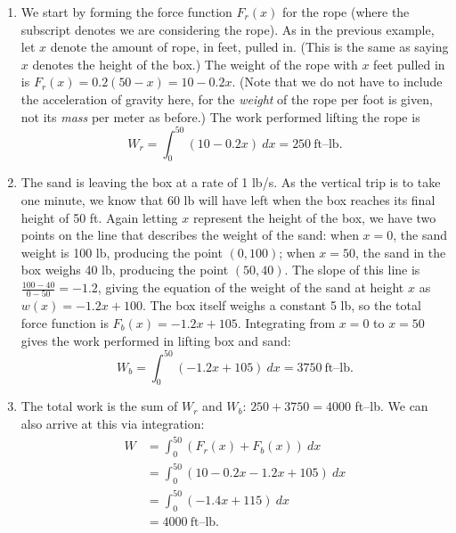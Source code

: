 {\begin{enumerate}
	\item		We start by forming the force function $F_r(x)$ for the rope (where the subscript denotes we are considering the rope). As in the previous example, let $x$ denote the amount of rope, in feet, pulled in. (This is the same as saying $x$ denotes the height of the box.) The weight of the rope with $x$ feet pulled in is $F_r(x) = 0.2(50-x) = 10-0.2x$. (Note that we do not have to include the acceleration of gravity here, for the \textit{weight} of the rope per foot is given, not its \textit{mass} per meter as before.) The work performed lifting the rope is 
\[
W_r = \int_0^{50} (10-0.2x)\ dx = 250\ \text{ft--lb}.
\]
	
	\item	The sand is leaving the box at a rate of 1 lb/s. As the vertical trip is to take one minute, we know that 60 lb will have left when the box reaches its final height of 50 ft. Again letting $x$ represent the height of the box, we have two points on the line that describes the weight of the sand: when $x=0$, the sand weight is 100 lb, producing the point $(0,100)$; when $x=50$, the sand in the box weighs 40 lb, producing the point $(50,40)$. The slope of this line is $\frac{100-40}{0-50} = -1.2$, giving the equation of the weight of the sand at height $x$ as $w(x) = -1.2x+100$. The box itself weighs a constant 5 lb, so the total force function is $F_b(x) = -1.2x+105$. Integrating from $x=0$ to $x=50$ gives the work performed in lifting box and sand:
\[
W_b = \int_0^{50} (-1.2x+105)\ dx = 3750\ \text{ft--lb.}
\]
	
	\item	The total work is the sum of $W_r$ and $W_b$: $250+3750=4000$ ft--lb. We can also arrive at this via integration:
	\begin{align*} W &= \int_0^{50} (F_r(x)+F_b(x))\ dx \\
									&= \int_0^{50} (10-0.2x-1.2x+105)\ dx \\
									&= \int_0^{50} (-1.4x+115) \ dx \\
									&= 4000 \ \text{ft--lb.}
	\end{align*}	
\end{enumerate}
\baselineskip
}\\

